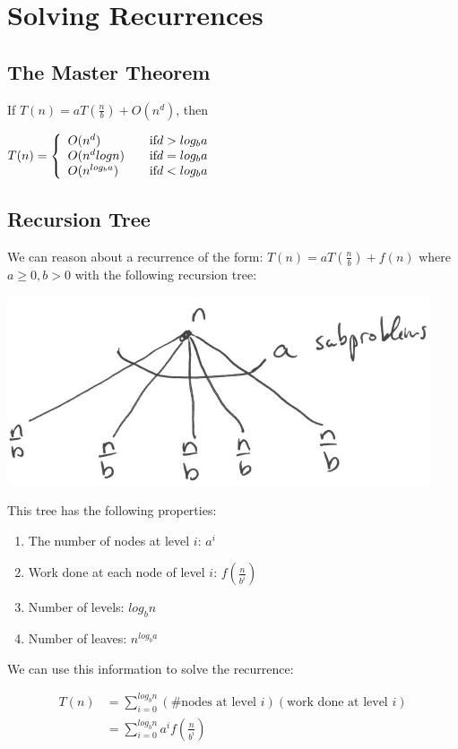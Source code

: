 \chapter{Solving Recurrences}

\section{The Master Theorem}

If $T(n) = aT(\frac{n}{b}) + O(n^d)$, then

\begin{math}
T(n) = \left\{
\begin{array}{l l}
O(n^d)       & \quad \text{if} d > log_ba \\
O(n^d logn)  & \quad \text{if} d = log_ba \\
O(n^{log_ba}) & \quad \text{if} d < log_ba \\
\end{array} \right.
\end{math}

\section{Recursion Tree}

We can reason about a recurrence of the form: $ T(n) = aT(\frac{n}{b})
+ f(n) $ where $ a \geq 0, b > 0 $ with the following recursion tree:

{
  \includegraphics[scale=1.2]{recursion_tree}
  \label{fig:recursion_tree}
}

This tree has the following properties:

\begin{enumerate}
\item The number of nodes at level $i$: $a^i$
\item Work done at each node of level $i$: $f(\frac{n}{b^i})$
\item Number of levels: $log_bn$
\item Number of leaves: $n^{log_ba}$
\end{enumerate}

We can use this information to solve the recurrence:

\begin{align*}
T(n)
&= \sum\limits_{i=0}^{log_bn} 
(\text{\# nodes at level } i) 
(\text{work done at level } i) \\
&= \sum\limits_{i=0}^{log_bn} a^i f(\frac{n}{b^i})
\end{align*}
